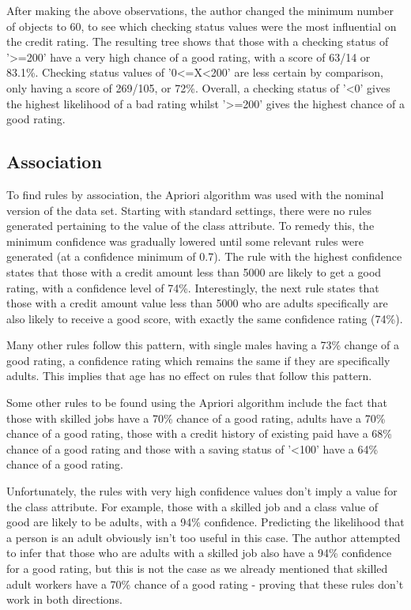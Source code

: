 \documentclass[runningheads, 12pt]{llncs}
\begin{document}
After making the above observations, the author changed the minimum number of objects to 60, to see which checking status values were the most influential on the credit rating. The resulting tree shows that those with a checking status of '\textgreater=200' have a very high chance of a good rating, with a score of 63/14 or 83.1\%. Checking status values of '0\textless=X\textless200' are less certain by comparison, only having a score of 269/105, or 72\%. Overall, a checking status of '\textless0' gives the highest likelihood of a bad rating whilst '\textgreater=200' gives the highest  chance of a good rating.

\subsection{Association}
To find rules by association, the Apriori algorithm was used with the nominal version of the data set. Starting with standard settings, there were no rules generated pertaining to the value of the class attribute. To remedy this, the minimum confidence was gradually lowered until some relevant rules were generated (at a confidence minimum of 0.7). The rule with the highest confidence states that those with a credit amount less than 5000 are likely to get a good rating, with a confidence level of 74\%. Interestingly, the next rule states that those with a credit amount value less than 5000 who are adults specifically are also likely to receive a good score, with exactly the same confidence rating (74\%).

Many other rules follow this pattern, with single males having a 73\% change of a good rating, a confidence rating which remains the same if they are specifically adults. This implies that age has no effect on rules that follow this pattern.

Some other rules to be found using the Apriori algorithm include the fact that those with skilled jobs have a 70\% chance of a good rating, adults have a 70\% chance of a good rating, those with a credit history of existing paid have a 68\% chance of a good rating and those with a saving status of '\textless100' have a 64\% chance of a good rating. 

Unfortunately, the rules with very high confidence values don't imply a value for the class attribute. For example, those with a skilled job and a class value of good are likely to be adults, with a 94\% confidence. Predicting the likelihood that a person is an adult obviously isn't too useful in this case. The author attempted to infer that those who are adults with a skilled job also have a 94\% confidence for a good rating, but this is not the case as we already mentioned that skilled adult workers have a 70\% chance of a good rating - proving that these rules don't work in both directions.
\end{document}
